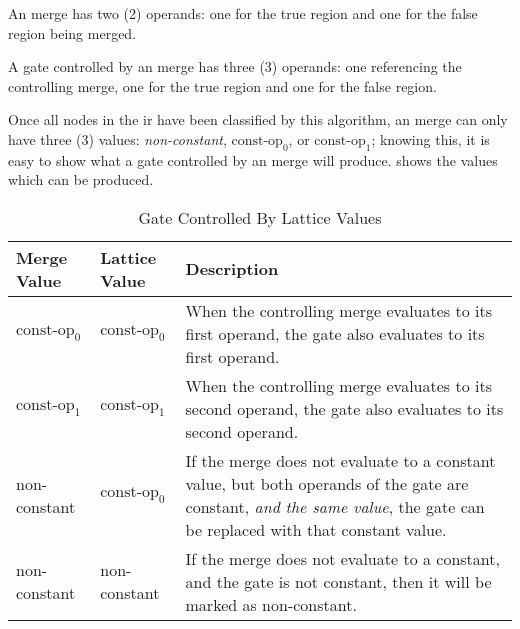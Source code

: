 \subsubsection{}

\begin{observation}
  An  merge has two (2) operands: one for the true
  region and one for the false region being merged.
\end{observation}

\begin{observation}
  A gate controlled by an  merge has three (3)
  operands: one referencing the controlling merge, one for the true
  region and one for the false region.
\end{observation}

Once all nodes in the \ac{ir} have been classified by this algorithm,
an  merge can only have three (3) values:
\emph{non-constant}, \emph{$\textrm{const-op}_0$}, or
\emph{$\textrm{const-op}_1$}; knowing this, it is easy to show what a
gate controlled by an  merge will produce.
 shows the values which can
be produced.

\begin{table}[h!]
  \begin{tabularx}{\linewidth}{|l|l|X|}
    \hline Merge Value & Lattice Value & Description \\

    \hline $\textrm{const-op}_0$ & $\textrm{const-op}_0$ & When the
    controlling merge evaluates to its first operand, the gate
    also evaluates to its first operand. \\

    \hline $\textrm{const-op}_1$ & $\textrm{const-op}_1$ & When the
    controlling merge evaluates to its second operand, the gate also
    evaluates to its second operand. \\

    \hline non-constant & $\textrm{const-op}_0$ & If the merge does not
    evaluate to a constant value, but both operands of the gate are
    constant, \emph{and the same value}, the gate can be replaced with
    that constant value. \\

    \hline non-constant & non-constant & If the merge does not
    evaluate to a constant, and the gate is not constant, then it will
    be marked as non-constant. \\
    \hline
  \end{tabularx}
  \caption{Gate Controlled By  Lattice Values}\label{table:const-prop-gate-if-lattice}
\end{table}

